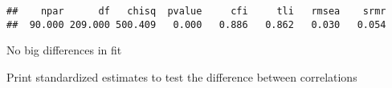 \documentclass[
]{article}
\newenvironment{Shaded}{\begin{snugshade}}{\end{snugshade}}
\newcommand{\KeywordTok}[1]{\textcolor[rgb]{0.13,0.29,0.53}{\textbf{#1}}}
\newcommand{\NormalTok}[1]{#1}
\newcommand{\OperatorTok}[1]{\textcolor[rgb]{0.81,0.36,0.00}{\textbf{#1}}}
\newcommand{\StringTok}[1]{\textcolor[rgb]{0.31,0.60,0.02}{#1}}
\begin{document}
\begin{verbatim}
##    npar      df   chisq  pvalue     cfi     tli   rmsea    srmr 
##  90.000 209.000 500.409   0.000   0.886   0.862   0.030   0.054
\end{verbatim}

No big differences in fit

Print standardized estimates to test the difference between correlations

\begin{Shaded}
\end{Shaded}
\end{document}
